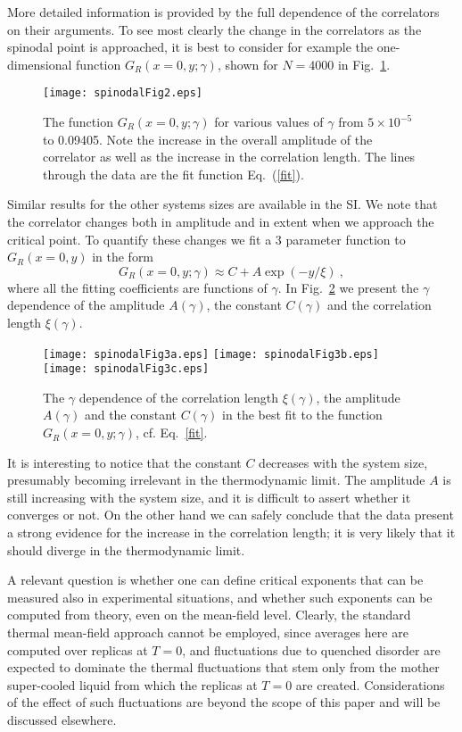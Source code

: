\documentclass[9pt,twocolumn,twoside]{pnas-new}
\begin{document}
 More detailed information is provided by the full dependence of the correlators on their arguments.
 To see most clearly the change in the correlators as the spinodal point is approached, it is best
 to consider for example the one-dimensional function $G_R(x=0,y;\gamma)$, shown for $N=4000$ in Fig.~\ref{cut}.
\begin{figure}[htb!]
 \texttt{[image: spinodalFig2.eps]}
 \caption{The function $G_R(x=0,y;\gamma)$ for various values of $\gamma$ from $5\times 10^{-5}$ to 0.09405.  Note the increase in the
 overall amplitude of the correlator as well as the increase in the correlation length. The lines through
 the data are the fit function Eq.~(\ref{fit}).}
 \label{cut}
\end{figure}
Similar results for the other systems sizes are available in the SI. We note that the correlator changes both in amplitude and in extent when we approach the critical point.
To quantify these changes we fit a 3 parameter function to $G_R(x=0,y)$ in the form
\begin{equation}
G_R(x=0,y;\gamma)\approx C+ A \exp(-y/\xi) \ ,
\label{fit}
\end{equation}
where all the fitting coefficients are functions of $\gamma$.
In Fig.~\ref{results} we present the $\gamma$ dependence of the amplitude $A(\gamma)$, the constant $C(\gamma)$ and the correlation length $\xi(\gamma)$.

\begin{figure}[h!]
\texttt{[image: spinodalFig3a.eps]}
\texttt{[image: spinodalFig3b.eps]}
\texttt{[image: spinodalFig3c.eps]}
 \caption{The $\gamma$ dependence of the correlation length $\xi(\gamma)$, the amplitude $A(\gamma)$ and the constant $C(\gamma)$ in the
 best fit to the function $G_R(x=0,y;\gamma)$, cf. Eq.~\ref{fit}. }
 \label{results}
\end{figure}
It is interesting to notice that the constant $C$ decreases with the system size, presumably becoming irrelevant
in the thermodynamic limit. The amplitude $A$ is still increasing with the system size, and it is difficult
to assert whether it converges or not. On the other hand we can safely conclude that the data present a strong evidence for the increase in the correlation length; it is very likely that it should diverge in the
thermodynamic limit.

A relevant question is whether one can define critical exponents that can be measured also in
experimental situations, and whether such exponents can be computed from theory, even on the
mean-field level. Clearly, the standard thermal mean-field approach cannot be employed, since
averages here are computed over replicas at $T=0$, and fluctuations due to quenched disorder are expected
to dominate the thermal fluctuations that stem only from the mother super-cooled liquid from which
the replicas at $T=0$ are created. Considerations of the effect of such fluctuations are beyond
the scope of this paper and will be discussed elsewhere.
\end{document}
